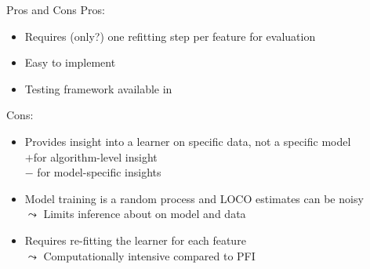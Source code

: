 \documentclass[11pt,compress,t,notes=noshow, aspectratio=169, xcolor=table]{beamer}
\begin{document}
\begin{frame}{Pros and Cons}
  Pros:
  \begin{itemize}
    \item Requires (only?) one refitting step per feature for evaluation
    \item Easy to implement
    \item Testing framework available in 
  \end{itemize}
%
  Cons:
  \begin{itemize}
    \item Provides insight into a learner on specific data, not a specific model\\
    $+$for algorithm-level insight\\
    $-$ for model-specific insights
    \item Model training is a random process and LOCO estimates can be noisy\\
    $\leadsto$ Limits inference about on model and data
    \item Requires re-fitting the learner for each feature\\
    $\leadsto$ Computationally intensive compared to PFI
  \end{itemize}
\end{frame}


\endlecture
\end{document}
